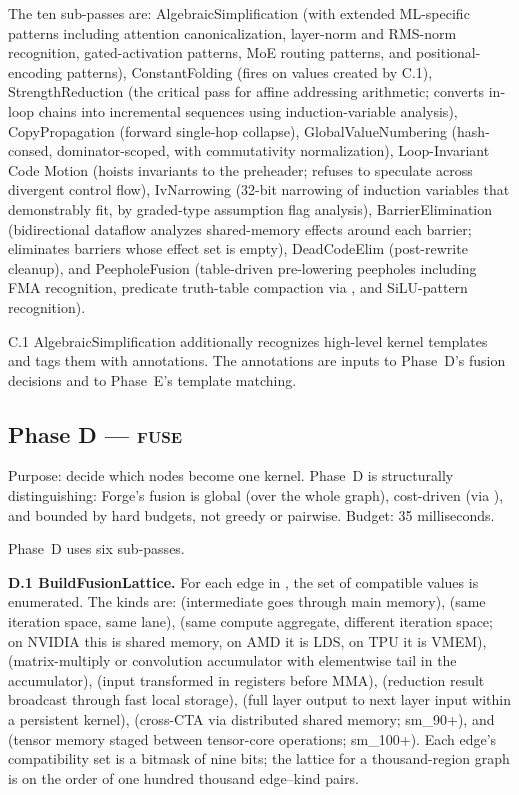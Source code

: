The ten sub-passes are: AlgebraicSimplification (with extended ML-specific patterns including attention canonicalization, layer-norm and RMS-norm recognition, gated-activation patterns, MoE routing patterns, and positional-encoding patterns), ConstantFolding (fires on values created by C.1), StrengthReduction (the critical pass for affine addressing arithmetic; converts in-loop  chains into incremental  sequences using induction-variable analysis), CopyPropagation (forward single-hop  collapse), GlobalValueNumbering (hash-consed, dominator-scoped, with commutativity normalization), Loop-Invariant Code Motion (hoists invariants to the preheader; refuses to speculate across divergent control flow), IvNarrowing (32-bit narrowing of induction variables that demonstrably fit, by graded-type assumption flag analysis), BarrierElimination (bidirectional dataflow analyzes shared-memory effects around each barrier; eliminates barriers whose effect set is empty), DeadCodeElim (post-rewrite cleanup), and PeepholeFusion (table-driven pre-lowering peepholes including FMA recognition, predicate truth-table compaction via , and SiLU-pattern recognition).

C.1 AlgebraicSimplification additionally recognizes high-level kernel templates and tags them with  annotations.
The annotations are inputs to Phase~D's fusion decisions and to Phase~E's template matching.

\subsection{Phase D --- \textsc{fuse}}
\label{sec:forge-phase-d}

Purpose: decide which  nodes become one kernel.
Phase~D is structurally distinguishing: Forge's fusion is global (over the whole graph), cost-driven (via ), and bounded by hard budgets, not greedy or pairwise.
Budget: 35 milliseconds.

Phase~D uses six sub-passes.

\textbf{D.1 BuildFusionLattice.}
For each edge in , the set of compatible  values is enumerated.
The kinds are:  (intermediate goes through main memory),  (same iteration space, same lane),  (same compute aggregate, different iteration space; on NVIDIA this is shared memory, on AMD it is LDS, on TPU it is VMEM),  (matrix-multiply or convolution accumulator with elementwise tail in the accumulator),  (input transformed in registers before MMA),  (reduction result broadcast through fast local storage),  (full layer output to next layer input within a persistent kernel),  (cross-CTA via distributed shared memory; sm\_90+), and  (tensor memory staged between tensor-core operations; sm\_100+).
Each edge's compatibility set is a bitmask of nine bits; the lattice for a thousand-region graph is on the order of one hundred thousand edge--kind pairs.

